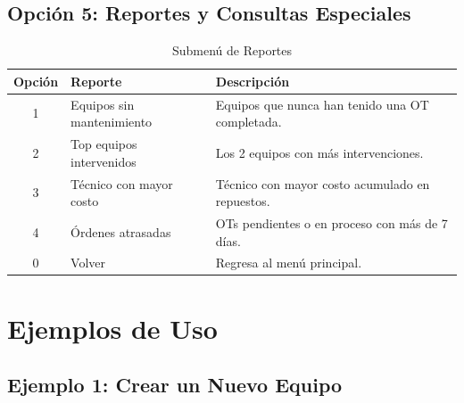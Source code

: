 \documentclass[12pt, a4paper]{article}
\begin{document}
\subsection{Opci\'on 5: Reportes y Consultas Especiales}

\begin{table}[H]
    \centering
    \begin{tabularx}{\textwidth}{c l X}
        \toprule
        \textbf{Opci\'on} & \textbf{Reporte} & \textbf{Descripci\'on} \\
        \midrule
        1 & Equipos sin mantenimiento & Equipos que nunca han tenido una OT completada. \\
        2 & Top equipos intervenidos & Los 2 equipos con m\'as intervenciones. \\
        3 & T\'ecnico con mayor costo & T\'ecnico con mayor costo acumulado en repuestos. \\
        4 & \'Ordenes atrasadas & OTs pendientes o en proceso con m\'as de 7 d\'ias. \\
        0 & Volver & Regresa al men\'u principal. \\
        \bottomrule
    \end{tabularx}
    \caption{Submen\'u de Reportes}
\end{table}

\newpage
\section{Ejemplos de Uso}

\subsection{Ejemplo 1: Crear un Nuevo Equipo}
\end{document}
